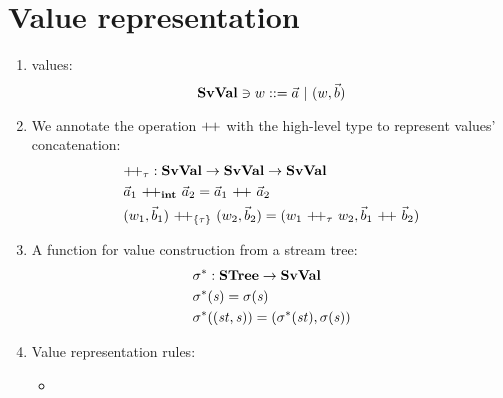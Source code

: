 \begin{itemize}
	\\ [8ex]

	\\[4ex]
	
\end{itemize}


\section{Value representation}
\begin{enumerate}[(1)]
	\item \fmsvcode values: $$\mathbf{SvVal} \ni w ::= \vec a \ | \ (w,\vec b) $$
	
	\item We annotate the operation ${\++}$ with the high-level type to represent \fmsvcode values' concatenation: 
	\begin{align*}
	&{\++}_{\tau}: \SvVal \->  \SvVal \-> \SvVal \\
	& \a_1 \ {\++}_{\int}  \ \a_2 = \a_1 \ {\++} \ \a_2 \\
	&{(w_1,\b_1)} \ {\++}_{\{\tau\}} \  {(w_2,\b_2)} = ({w_1} \ {\++}_{\tau} \ {w_2}, {\b_1} \ {\++} \ {\b_2})
	\end{align*}
	
	\item A function for \fmsvcode value construction from a stream tree:
	\begin{align*}
	&\sgm^* : \STree \-> \SvVal \\
	&\sgm^*(\s) = \sgm(\s) \\
	&\sgm^*((\st,\s)) = (\sgm^*(\st), \sgm(\s)) 
	\end{align*}

\item Value representation rules:
	
	\begin{itemize}		
		\item {}
		
	\end{itemize}
\end{enumerate}




